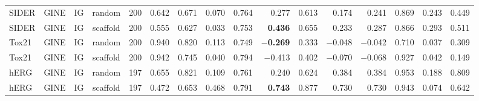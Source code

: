 \begin{table}
{\begin{tabular}{lllcrrrrrrrrrrrr}
SIDER & GINE & IG & random & 200 & 0.642 & 0.671 & 0.070 & 0.764 & 0.277 & 0.613 & 0.174 & 0.241 & 0.869 & 0.243 & 0.449 \\
SIDER & GINE & IG & scaffold & 200 & 0.555 & 0.627 & 0.033 & 0.753 & \textbf{0.436} & 0.655 & 0.233 & 0.287 & 0.866 & 0.293 & 0.511 \\
\addlinespace[2pt]
Tox21 & GINE & IG & random & 200 & 0.940 & 0.820 & 0.113 & 0.749 & \textbf{$-$0.269} & 0.333 & $-$0.048 & $-$0.042 & 0.710 & 0.037 & 0.309 \\
Tox21 & GINE & IG & scaffold & 200 & 0.942 & 0.745 & 0.040 & 0.794 & $-$0.413 & 0.402 & $-$0.070 & $-$0.068 & 0.927 & 0.042 & 0.149 \\
\addlinespace[2pt]
hERG & GINE & IG & random & 197 & 0.655 & 0.821 & 0.109 & 0.761 & 0.240 & 0.624 & 0.384 & 0.384 & 0.953 & 0.188 & 0.809 \\
hERG & GINE & IG & scaffold & 197 & 0.472 & 0.653 & 0.468 & 0.791 & \textbf{0.743} & 0.877 & 0.730 & 0.730 & 0.943 & 0.074 & 0.642 \\
\bottomrule
\end{tabular}}
\end{table}

